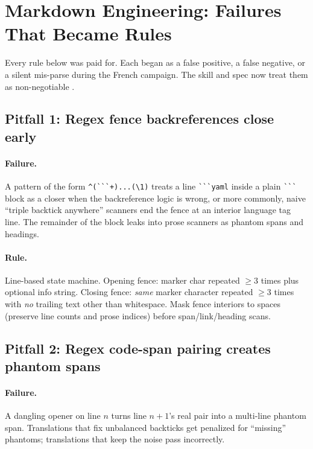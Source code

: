 \documentclass[11pt]{article}
\theoremstyle{definition}
\theoremstyle{plain}
\theoremstyle{remark}
\begin{document}
\section{Markdown Engineering: Failures That Became Rules}
\label{sec:markdown}

Every rule below was paid for. Each began as a false positive, a false
negative, or a silent mis-parse during the French campaign. The skill and
spec now treat them as non-negotiable
\citep{hermespr80391,docsgermskill}.

\subsection{Pitfall 1: Regex fence backreferences close early}

\paragraph{Failure.} A pattern of the form
\texttt{\^{}(\`{}\`{}\`{}+)...(\textbackslash1)} treats a line
\texttt{\`{}\`{}\`{}yaml} inside a plain \texttt{\`{}\`{}\`{}} block as a
closer when the backreference logic is wrong, or more commonly, naive
``triple backtick anywhere'' scanners end the fence at an interior language
tag line. The remainder of the block leaks into prose scanners as phantom
spans and headings.

\paragraph{Rule.} Line-based state machine. Opening fence: marker char
repeated $\ge 3$ times plus optional info string. Closing fence: \emph{same}
marker character repeated $\ge 3$ times with \emph{no} trailing text other
than whitespace. Mask fence interiors to spaces (preserve line counts and
prose indices) before span/link/heading scans.

\subsection{Pitfall 2: Regex code-span pairing creates phantom spans}

\paragraph{Failure.} A dangling opener on line $n$ turns line $n+1$'s real
pair into a multi-line phantom span. Translations that fix unbalanced
backticks get penalized for ``missing'' phantoms; translations that keep the
noise pass incorrectly.
\end{document}
